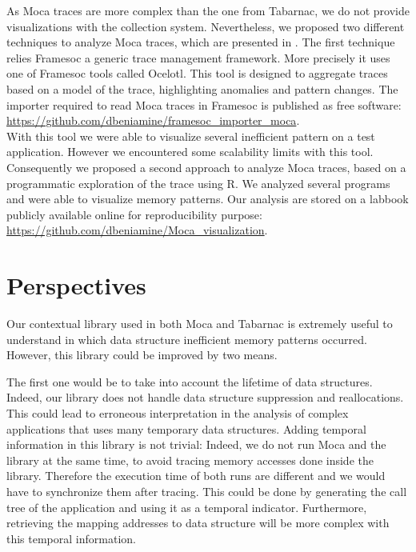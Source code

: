 As \gls{Moca} traces are more complex than the one from \gls{Tabarnac}, we do not provide visualizations with the collection system.
Nevertheless, we proposed two different techniques to analyze \gls{Moca} traces, which are presented in .
The first technique relies \gls{Framesoc} a generic trace management framework.
More precisely it uses one of \gls{Framesoc} tools called \gls{Ocelotl}.
This tool is designed to aggregate traces based on a model of the trace, highlighting anomalies and pattern changes.
The importer required to read \gls{Moca} traces in \gls{Framesoc} is published as free software:\\
\url{https://github.com/dbeniamine/framesoc\_importer\_moca}.\\
With this tool we were able to visualize several inefficient pattern on a test application.
However we encountered some scalability limits with this tool.
Consequently we proposed a second approach to analyze \gls{Moca} traces, based on a programmatic exploration of the trace using \gls{R}.
We analyzed several programs and were able to visualize memory patterns.
Our analysis are stored on a labbook publicly available online for reproducibility purpose:\\
\url{https://github.com/dbeniamine/Moca_visualization}.

\section{Perspectives}

Our contextual library used in both \gls{Moca} and \gls{Tabarnac} is extremely useful to understand in which data structure inefficient memory patterns occurred.
However, this library could be improved by two means.

The first one would be to take into account the lifetime of data structures.
Indeed, our library does not handle data structure suppression and reallocations.
This could lead to erroneous interpretation in the analysis of complex applications that uses many temporary data structures.
Adding temporal information in this library is not trivial:
Indeed, we do not run \gls{Moca} and the library at the same time, to avoid tracing memory accesses done inside the library.
Therefore the execution time of both runs are different and we would have to synchronize them after tracing.
This could be done by generating the call tree of the application and using it as a temporal indicator.
Furthermore, retrieving the mapping addresses to data structure will be more complex with this temporal information.

